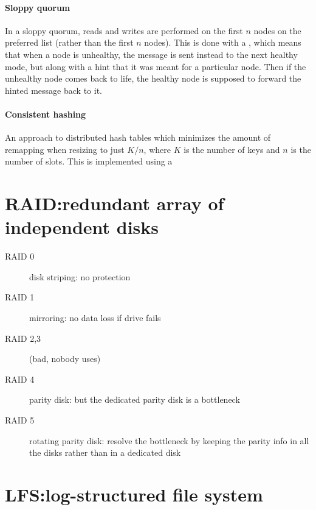 \documentclass{article}
\begin{document}
\paragraph{Sloppy quorum} In a sloppy quorum, reads and writes are
performed on the first $n$  nodes on the preferred list
(rather than the first $n$ nodes). This is done with a , which means that when a node is unhealthy, the message is
sent instead to the next healthy mode, but along with a hint that it
was meant for a particular node. Then if the unhealthy node comes back
to life, the healthy node is supposed to forward the hinted message
back to it.

\paragraph{Consistent hashing} An approach to distributed hash tables
which minimizes the amount of remapping when resizing to just $K/n$,
where $K$ is the number of keys and $n$ is the number of slots. This
is implemented using a 

\section{RAID:\@ redundant array of independent disks}

\begin{description}
\item[RAID 0] disk striping: no protection
\item[RAID 1] mirroring: no data loss if drive fails
\item[RAID 2,3] (bad, nobody uses)
\item[RAID 4] parity disk: but the dedicated parity disk is a bottleneck
\item[RAID 5] rotating parity disk: resolve the bottleneck by keeping
  the parity info in all the disks rather than in a dedicated disk
\end{description}

\section{LFS:\@ log-structured file system}
\end{document}
